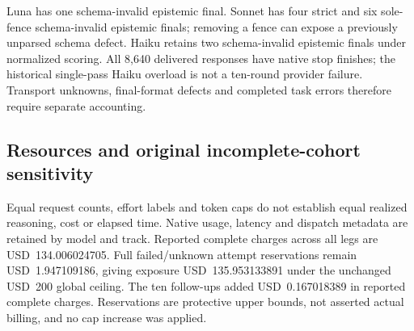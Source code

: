 \documentclass[a4paper,preprint,12pt,numbers,nopreprintline]{elsarticle}
\begin{document}
Luna has one schema-invalid epistemic final. Sonnet has four strict and six sole-fence schema-invalid epistemic finals; removing a fence can expose a previously unparsed schema defect. Haiku retains two schema-invalid epistemic finals under normalized scoring. All 8,640 delivered responses have native stop finishes; the historical single-pass Haiku overload is not a ten-round provider failure. Transport unknowns, final-format defects and completed task errors therefore require separate accounting.

\subsection{Resources and original incomplete-cohort sensitivity}
Equal request counts, effort labels and token caps do not establish equal realized reasoning, cost or elapsed time. Native usage, latency and dispatch metadata are retained by model and track. Reported complete charges across all legs are USD~134.006024705. Full failed/unknown attempt reservations remain USD~1.947109186, giving exposure USD~135.953133891 under the unchanged USD~200 global ceiling. The ten follow-ups added USD~0.167018389 in reported complete charges. Reservations are protective upper bounds, not asserted actual billing, and no cap increase was applied.
\end{document}
